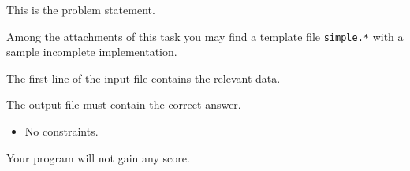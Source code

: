 \usepackage{xcolor}
\usepackage{caption}
\usepackage{afterpage}
\usepackage{pifont,mdframed}
\usepackage[bottom]{footmisc}


This is the problem statement.

\begin{warning}
    Among the attachments of this task you may find a template file \texttt{simple.*} with a sample incomplete implementation.
\end{warning}


\InputFile

The first line of the input file contains the relevant data.


\OutputFile

The output file must contain the correct answer.


\Constraints

\begin{itemize}[nolistsep, itemsep=2mm]
    \item No constraints.
\end{itemize}

\Scoring

Your program will not gain any score.
